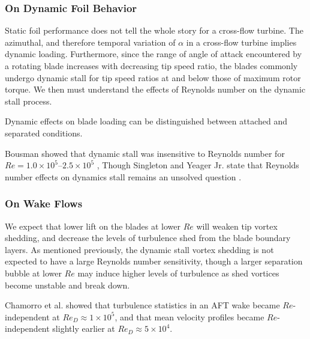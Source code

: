 \documentclass[energies,article,accept,moreauthors,pdftex,12pt,a4paper]{mdpi}
\begin{document}
\subsubsection{On Dynamic Foil Behavior}

Static foil performance does not tell the whole story for a cross-flow turbine.
The azimuthal, and therefore temporal variation of $\alpha$ in a cross-flow
turbine implies dynamic loading. Furthermore, since the range of angle of
attack encountered by a rotating blade increases with decreasing tip speed
ratio, the blades commonly undergo
dynamic stall for tip speed ratios at and below those of maximum rotor
torque\cite{Para2002}. We then must understand the effects of Reynolds number on
the dynamic stall process.

Dynamic effects on blade loading can be distinguished between attached and
separated conditions.


Bousman showed that dynamic stall was insensitive to Reynolds number for $Re=1.0
\times 10^5$--$2.5 \times 10^5$ \cite{Bousman2000-evaluation}, Though Singleton
and Yeager Jr. state that Reynolds number effects on dynamics stall remains an
unsolved question \cite{Singleton2000}.


\subsubsection{On Wake Flows}

We expect that lower lift on the blades at lower $Re$ will weaken tip vortex
shedding, and decrease the levels of turbulence shed from the blade boundary
layers. As mentioned previously, the dynamic stall vortex shedding is not
expected to have a large Reynolds number sensitivity, though a larger separation
bubble at lower $Re$ may induce higher levels of turbulence as shed vortices
become unstable and break down.


Chamorro et al. \cite{Chamorro2012} showed that turbulence statistics in an AFT
wake became
$Re$-independent at $Re_D \approx 1 \times 10^5$, and that mean velocity
profiles became $Re$-independent slightly earlier at $Re_D \approx 5 \times
10^4$.
\end{document}
